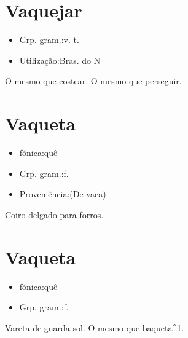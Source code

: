 \documentclass{article}
\begin{document}
\section{Vaquejar}
\begin{itemize}
\item {Grp. gram.:v. t.}
\end{itemize}
\begin{itemize}
\item {Utilização:Bras. do N}
\end{itemize}
O mesmo que \textunderscore costear\textunderscore .
O mesmo que \textunderscore perseguir\textunderscore .
\section{Vaqueta}
\begin{itemize}
\item {fónica:quê}
\end{itemize}
\begin{itemize}
\item {Grp. gram.:f.}
\end{itemize}
\begin{itemize}
\item {Proveniência:(De \textunderscore vaca\textunderscore )}
\end{itemize}
Coiro delgado para forros.
\section{Vaqueta}
\begin{itemize}
\item {fónica:quê}
\end{itemize}
\begin{itemize}
\item {Grp. gram.:f.}
\end{itemize}
Vareta de guarda-sol.
O mesmo que \textunderscore baqueta\textunderscore ^1.
\end{document}
